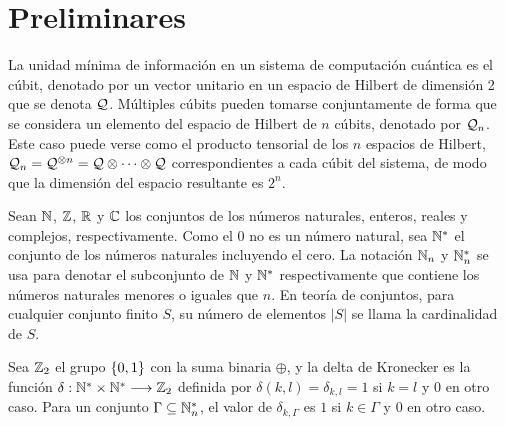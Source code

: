 \section{Preliminares}
La unidad mínima de información en un sistema de computación cuántica es el cúbit, denotado por un vector unitario en un espacio de Hilbert de dimensión 2 que se denota $\mathcal{Q}$.
Múltiples cúbits pueden tomarse conjuntamente de forma que se considera un elemento del espacio de Hilbert de $n$ cúbits, denotado por $\mathcal{Q}_n$.
Este caso puede verse como el producto tensorial de los $n$ espacios de Hilbert, $\mathcal{Q}_n=\mathcal{Q}^{\otimes n}=\mathcal{Q}\otimes\dots\otimes\mathcal{Q}$ correspondientes a cada cúbit del sistema, de modo que la dimensión del espacio resultante es $2^n$.

Sean $\mathbb{N}$, $\mathbb{Z}$, $\mathbb{R}$ y $\mathbb{C}$ los conjuntos de los números naturales, enteros, reales y complejos, respectivamente.
Como el $0$ no es un número natural, sea $\mathbb{N}^*$ el conjunto de los números naturales incluyendo el cero.
La notación $\mathbb{N}_n$ y $\mathbb{N}^*_n$ se usa para denotar el subconjunto de $\mathbb{N}$ y $\mathbb{N}^*$ respectivamente que contiene los números naturales menores o iguales que $n$.
En teoría de conjuntos, para cualquier conjunto finito $S$, su número de elementos $|S|$ se llama la cardinalidad de $S$.

Sea $\mathbb{Z}_2$ el grupo $\{0,1\}$ con la suma binaria $\oplus$, y la delta de Kronecker es la función $\delta:\mathbb{N}^*\times\mathbb{N}^*\longrightarrow\mathbb{Z}_2$ definida por $\delta(k,l)=\delta_{k,l}=1$ si $k=l$ y $0$ en otro caso.
Para un conjunto $\Gamma\subseteq\mathbb{N}^*_n$, el valor de $\delta_{k,\Gamma}$ es $1$ si $k\in\Gamma$ y $0$ en otro caso.
